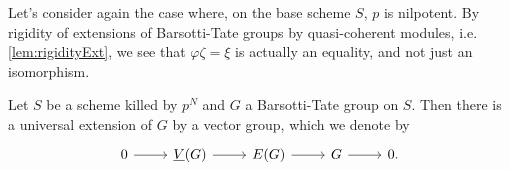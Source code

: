 \documentclass[../Main]{subfiles}
\begin{document}
\begin{rem}[]
	Let's consider again the case where, on the base
	scheme $S$, $p$ is nilpotent.
	By rigidity of extensions of Barsotti-Tate groups
	by quasi-coherent modules, i.e. \cref{lem:rigidityExt}, 
	we see that $\varphi\zeta = \xi$ is
	actually an equality, and not just an isomorphism.
\end{rem}


\begin{prop}[]
	Let $S$ be a scheme killed by $p^N$ and $G$
	a Barsotti-Tate group on $S$.
	Then there is a universal extension of $G$ by a vector group,
	which we denote by
	\begin{equation*}
	\begin{tikzcd}
		0 \arrow[r, "", rightarrow] &
		\underline{V}(G) \arrow[r, "", rightarrow] &
		E(G) \arrow[r, "", rightarrow] &
		G \arrow[r, "", rightarrow] &
		0
	.\end{tikzcd}
	\end{equation*}
\end{prop}
\end{document}
